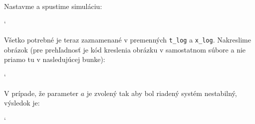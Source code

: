 \documentclass[a4paper, 10pt, ]{article}
\begin{document}
\noindent
Nastavme a spustime simuláciu:

{\catcode`

}

Všetko potrebné je teraz zaznamenané v premenných  \lstinline{t_log} a \lstinline{x_log}. Nakreslime obrázok (pre prehľadnosť je kód kreslenia obrázku v samostatnom súbore a nie priamo tu v nasledujúcej bunke):

{\catcode`

}

\begin{centering}


    \vspace{-2mm}

    \figcaption{}

    \vspace{2mm}

    \label{figsc_ar02_fig03_0}

\end{centering}




\noindent
V prípade, že parameter $a$ je zvolený tak aby bol riadený systém nestabilný, výsledok je:



{\catcode`

}

\begin{centering}


    \vspace{-2mm}

    \figcaption{}

    \vspace{2mm}

    \label{figsc_ar02_fig03_1}

\end{centering}
\end{document}
